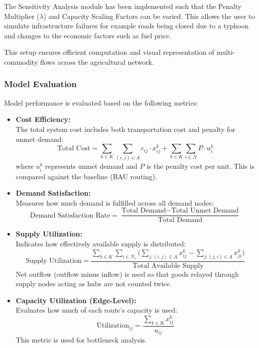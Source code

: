 \documentclass{icsthesis}
\begin{document}
\begin{mainmatter}
The Sensitivity Analysis module has been implemented such that the Penalty Multiplier ($\lambda$) and Capacity Scaling Factors can be varied. This allows the user to simulate infrastructure failures for example roads being closed due to a typhoon and changes to the economic factors such as fuel price.

This setup ensures efficient computation and visual representation of multi-commodity flows across the agricultural network.


\subsubsection{Model Evaluation}
Model performance is evaluated based on the following metrics:

\begin{itemize}

    \item \textbf{Cost Efficiency:} \\
    The total system cost includes both transportation cost and penalty for unmet demand:
    \[
    \text{Total Cost} = 
    \sum_{k \in K} \sum_{(i,j) \in A} c_{ij} \cdot x_{ij}^k 
    + \sum_{k \in K} \sum_{i \in N} P \cdot u_i^k
    \]
    where $u_i^k$ represents unmet demand and $P$ is the penalty cost per unit. 
    This is compared against the baseline (BAU routing).

    \item \textbf{Demand Satisfaction:} \\
    Measures how much demand is fulfilled across all demand nodes:
    \[
    \text{Demand Satisfaction Rate} = 
    \frac{\text{Total Demand} - \text{Total Unmet Demand}}{\text{Total Demand}}
    \]

    \item \textbf{Supply Utilization:} \\
    Indicates how effectively available supply is distributed:
    \[
    \text{Supply Utilization} = 
    \frac{\sum_{k \in K}\sum_{i \in N_s}\Big(\sum_{j:(i,j)\in A} x_{ij}^k - \sum_{j:(j,i)\in A} x_{ji}^k\Big)}{\text{Total Available Supply}}
    \]
    Net outflow (outflow minus inflow) is used so that goods relayed through supply nodes acting as hubs are not counted twice.

    \item \textbf{Capacity Utilization (Edge-Level):} \\
    Evaluates how much of each route's capacity is used:
    \[
    \text{Utilization}_{ij} = 
    \frac{\sum_{k \in K} x_{ij}^k}{u_{ij}}
    \]
    This metric is used for bottleneck analysis.


\end{itemize}
\end{mainmatter}
\end{document}
